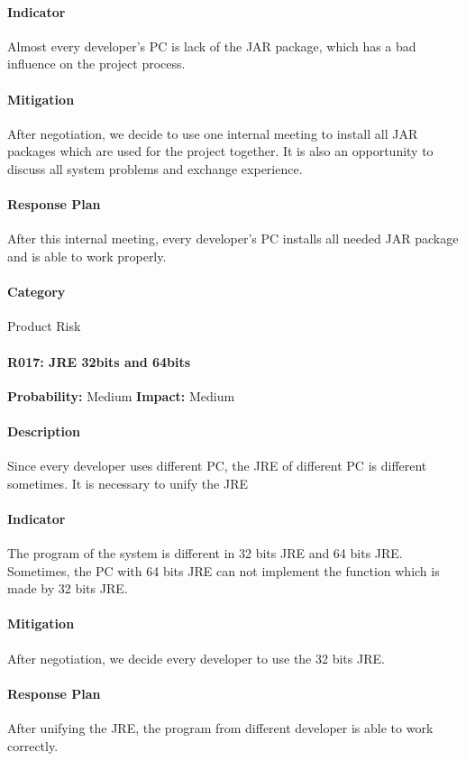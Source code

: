 \documentclass[11pt, a4paper]{report}
\begin{document}
	\paragraph{Indicator} Almost every developer's PC is lack of the JAR package, which has a bad influence on the project process. 
	\paragraph{Mitigation} After negotiation, we decide to use one internal meeting to install all JAR packages which are used for the project together. It is also an opportunity to discuss all system problems and exchange experience.  
	\paragraph{Response Plan} After this internal meeting, every developer's PC installs all needed JAR package and is able to work properly. \\ 
	\paragraph{Category}Product Risk
	
	\paragraph{R017: JRE 32bits and 64bits} \hspace{1cm} \textbf{Probability: }Medium\hspace{1cm}   \textbf{Impact: }Medium
	\paragraph{Description} Since every developer uses different PC, the JRE of different PC is different sometimes. It is necessary to unify the JRE  
	\paragraph{Indicator} The program of the system is different in 32 bits JRE and 64 bits JRE. Sometimes, the PC with 64 bits JRE can not implement the function which is made by 32 bits JRE.  
	\paragraph{Mitigation} After negotiation, we decide every developer to use the 32 bits JRE.  
	\paragraph{Response Plan} After unifying the JRE, the program from different developer is able to work correctly.  \\ 
\end{document}

